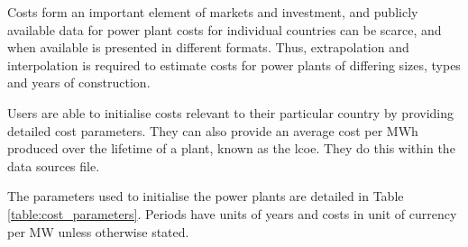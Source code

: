 Costs form an important element of markets and investment, and publicly available data for power plant costs for individual countries can be scarce, and when available is presented in different formats. Thus, extrapolation and interpolation is required to estimate costs for power plants of differing sizes, types and years of construction.

Users are able to initialise costs relevant to their particular country by providing detailed cost parameters. They can also provide an average cost per MWh produced over the lifetime of a plant, known as the \acrfull{lcoe}. They do this within the data sources file.

The parameters used to initialise the power plants are detailed in Table \ref{table:cost_parameters}. Periods have units of years and costs in unit of currency per MW unless otherwise stated.


